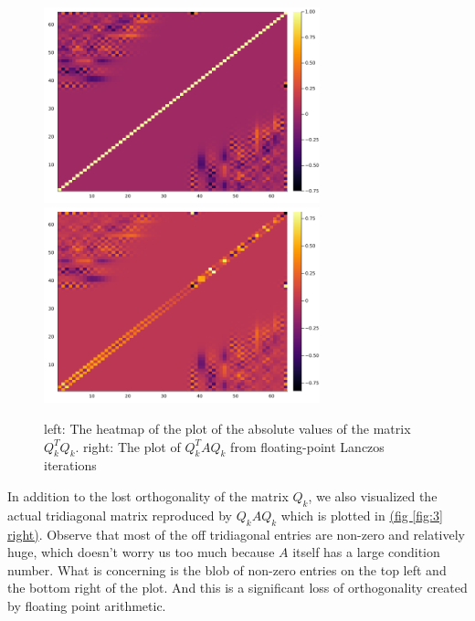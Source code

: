 \documentclass[]{article}
\theoremstyle{definition}
\begin{document}
            \begin{figure}[H]
                \centering
                \includegraphics[width=8cm]{fig3.png}
                \includegraphics[width=8cm]{fig4.png}
                \caption{left: The heatmap of the plot of the absolute values of the matrix $Q^T_kQ_k$. right: The plot of $Q_k^TAQ_k$ from floating-point Lanczos iterations}
            \end{figure}\label{fig:3}
            In addition to the lost orthogonality of the matrix $Q_k$, we also visualized the actual tridiagonal matrix reproduced by $Q_kAQ_k$ which is plotted in \hyperref[fig:3]{(fig \ref*{fig:3} right)}. Observe that most of the off tridiagonal entries are non-zero and relatively huge, which doesn't worry us too much because $A$ itself has a large condition number. What is concerning is the blob of non-zero entries on the top left and the bottom right of the plot. And this is a significant loss of orthogonality created by floating point arithmetic. 
\end{document}

